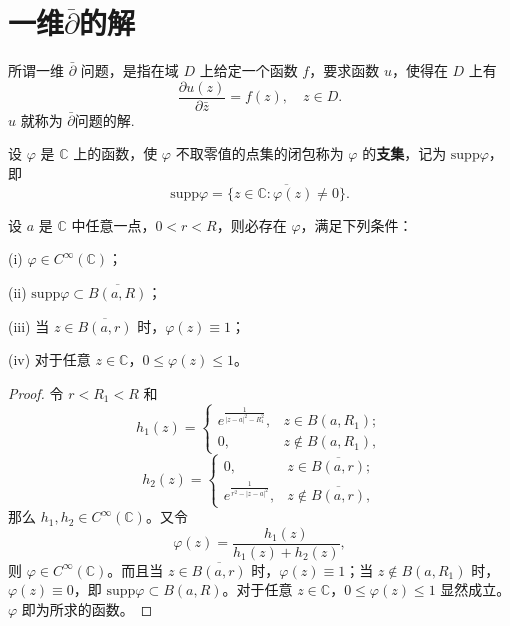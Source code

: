 \documentclass[../../main.tex]{subfiles}
\begin{document}
\section{一维$\overline{\partial }$的解}

\begin{definition}
所谓一维 \( \bar{\partial} \) 问题，是指在域 \( D \) 上给定一个函数 \( f \)，要求函数 \( u \)，使得在 \( D \) 上有
\[
\frac{\partial u(z)}{\partial \bar{z}} = f(z), \quad z \in D.
\]
\( u \) 就称为 \( \bar{\partial} \)问题的解.
\end{definition}

\begin{definition}
设 \( \varphi \) 是 \( \mathbb{C} \) 上的函数，使 \( \varphi \) 不取零值的点集的闭包称为 \( \varphi \) 的\textbf{支集}，记为 \( \text{supp}\varphi \)，即
\[
\text{supp}\varphi = \overline{\{ z \in \mathbb{C} : \varphi(z) \neq 0 \}}.
\]
\end{definition}

\begin{lemma}\label{lemma:引理3.7.2}
设 \( a \) 是 \( \mathbb{C} \) 中任意一点，\( 0 < r < R \)，则必存在 \( \varphi \)，满足下列条件：

(i) \( \varphi \in C^\infty(\mathbb{C}) \)；

(ii) \( \text{supp}\varphi \subset \overline{B(a,R)} \)；

(iii) 当 \( z \in \overline{B(a,r)} \) 时，\( \varphi(z) \equiv 1 \)；

(iv) 对于任意 \( z \in \mathbb{C} \)，\( 0 \leqslant \varphi(z) \leqslant 1 \)。
\end{lemma}
\begin{proof}
令 \( r < R_1 < R \) 和
\[
h_1(z) = \begin{cases} 
\displaystyle e^{\frac{1}{|z - a|^2 - R_1^2}}, & z \in B(a,R_1); \\
0, & z \notin B(a,R_1),
\end{cases}
\]
\[
h_2(z) = \begin{cases} 
0, & z \in \overline{B(a,r)}; \\
\displaystyle e^{\frac{1}{r^2 - |z - a|^2}}, & z \notin \overline{B(a,r)},
\end{cases}
\]
那么 \( h_1, h_2 \in C^\infty(\mathbb{C}) \)。又令
\[
\varphi(z) = \frac{h_1(z)}{h_1(z) + h_2(z)},
\]
则 \( \varphi \in C^\infty(\mathbb{C}) \)。而且当 \( z \in \overline{B(a,r)} \) 时，\( \varphi(z) \equiv 1 \)；当 \( z \notin B(a,R_1) \) 时，\( \varphi(z) \equiv 0 \)，即 \( \text{supp}\varphi \subset B(a,R) \)。对于任意 \( z \in \mathbb{C} \)，\( 0 \leqslant \varphi(z) \leqslant 1 \) 显然成立。\( \varphi \) 即为所求的函数。

\end{proof}
\end{document}
